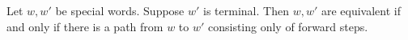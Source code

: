 Let $w, w'$ be special words. Suppose $w'$ is terminal. Then $w, w'$ are equivalent if and only if there is a path from $w$ to $w'$ consisting only of forward steps.
